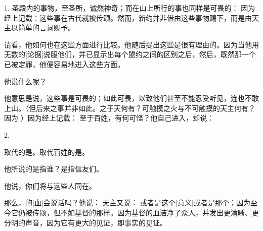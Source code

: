 1. 圣殿内的事物，至圣所，诚然神奇；而在山上所行的事也同样是可畏的：  因为经上记载：这些事在古代就被传颂。然而，新约并非借由这些事物赐下，而是由天主以简单的言词赐予。\par

请看，他如何也在这些方面进行比较。他随后提出这些是很有理由的。因为当他用无数的[论据]说服他们，并已显示出每个盟约之间的区别之后，然后，既然那一个已被定罪，他便容易地进入这些方面。\par

他说什么呢？\par

他意思是说，这些事是可畏的；如此可畏，以致他们甚至不能忍受听见，连也不敢上山。（但后来之事并非如此。之于天何有？可触摸之火与不可触摸的天主何有？因为 ）因为经上记载： 至于百姓，有何可怪？他自己进入，却说： \par

2. \par

取代的是。取代百姓的是。\par

他所说的是指谁？是指信友们。\par

他说，你们将与这些人同在。\par

那么，的[血]会说话吗？他说：  天主又说：  或者是这个[意义]或者是那个；因为至今它仍被传颂，但不如基督的那样。因为基督的血洁净了众人，并发出更清晰、更分明的声音，因为它有更大的见证，即事实的见证。\par

